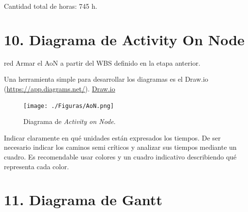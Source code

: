 \documentclass[
11pt, %
]{charter}
\begin{document}
Cantidad total de horas: 745 h.




\section{10. Diagrama de Activity On Node}
\label{sec:AoN}

\begin{consigna}{red}
Armar el AoN a partir del WBS definido en la etapa anterior.

Una herramienta simple para desarrollar los diagramas es el Draw.io (\url{https://app.diagrams.net/}).
\href{https://app.diagrams.net}{Draw.io}


\begin{figure}[htpb]
\centering 
\texttt{[image: ./Figuras/AoN.png]}
\caption{Diagrama de \textit{Activity on Node}.}
\label{fig:AoN}
\end{figure}

Indicar claramente en qué unidades están expresados los tiempos.
De ser necesario indicar los caminos semi críticos y analizar sus tiempos mediante un cuadro.
Es recomendable usar colores y un cuadro indicativo describiendo qué representa cada color.

\end{consigna}

\section{11. Diagrama de Gantt}
\label{sec:gantt}
\end{document}
